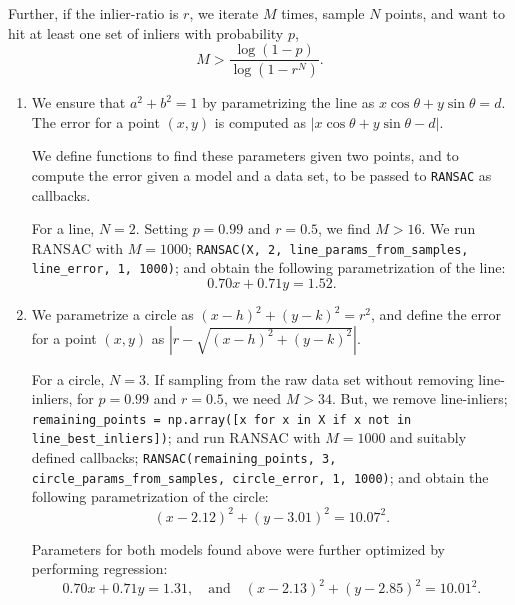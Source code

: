 \documentclass{article}[a4paper]
\begin{document}
	Further, if the inlier-ratio is $r$, we iterate $M$ times, sample $N$ points, and want to hit at least one set of inliers with probability $p$, \[
		M > \dfrac{\log(1 - p)}{\log(1 - r^N)}.
	\]
	\begin{enumerate}
		\item We ensure that $a^2 + b^2 = 1$ by parametrizing the line as $x\cos\theta + y\sin\theta = d$. The error for a point $(x, y)$ is computed as $|x\cos\theta + y\sin\theta - d|$.
		
		We define functions to find these parameters given two points, and to compute the error given a model and a data set, to be passed to \lstinline|RANSAC| as callbacks.
		
		For a line, $N=2$. Setting $p=0.99$ and $r=0.5$, we find $M>16$. We run RANSAC with $M=1000$; \lstinline|RANSAC(X, 2, line_params_from_samples, line_error, 1, 1000)|; and obtain the following parametrization of the line: \[
			0.70x + 0.71y = 1.52.
		\]

		\item We parametrize a circle as $(x - h)^2 + (y - k)^2 = r^2$, and define the error for a point $(x, y)$ as $\left|r - \sqrt{\left(x - h\right)^2 + \left(y - k\right)^2}\right|$.
		
		For a circle, $N=3$. If sampling from the raw data set without removing line-inliers, for $p=0.99$ and $r=0.5$, we need $M>34$. But, we remove line-inliers; \lstinline|remaining_points = np.array([x for x in X if x not in line_best_inliers])|; and run RANSAC with $M=1000$ and suitably defined callbacks; \lstinline|RANSAC(remaining_points, 3, circle_params_from_samples, circle_error, 1, 1000)|; and obtain the following parametrization of the circle: \[
			(x - 2.12)^2 + (y - 3.01)^2 = 10.07^2.
		\]
		
		Parameters for both models found above were further optimized by performing regression: \[
			0.70x + 0.71y = 1.31, \quad\text{and}\quad (x - 2.13)^2 + (y - 2.85)^2 = 10.01^2.
		\]


\end{enumerate}
\end{document}

